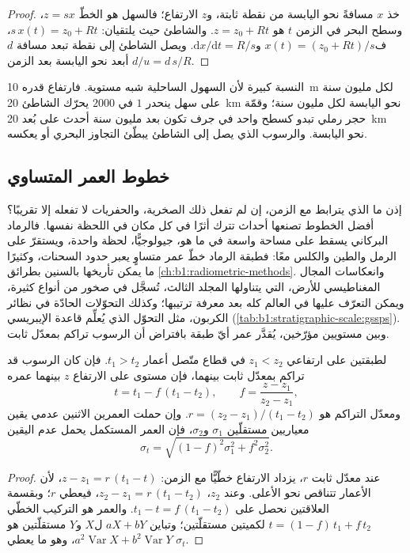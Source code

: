 \begin{proof}
خذ $x$ مسافةً نحو اليابسة من نقطة ثابتة، و$z$ الارتفاع؛ فالسهل هو الخطّ $z = s x$، وسطح البحر في الزمن $t$ هو $z = z_0 + R t$. والشاطئ حيث يلتقيان: $s\,x(t) = z_0 + R t$، ف$x(t) = (z_0 + R t)/s$ و$\mathrm dx/\mathrm dt = R/s$. ويصل الشاطئ إلى نقطة تبعد مسافة $d$ أبعد نحو اليابسة بعد الزمن $d/u = d\,s/R$.
\end{proof}

النسبة كبيرة لأن السهول الساحلية شبه مستوية. فارتفاع قدره \qty{10}{m} لكل مليون سنة على سهل ينحدر $1$ في $2000$ يحرّك الشاطئ \qty{20}{km} نحو اليابسة لكل مليون سنة؛ وقمّة حجر رملي تبدو كسطح واحد في جرف تكون بعد مليون سنة أحدث على بُعد \qty{20}{km} نحو اليابسة. والرسوب الذي يصل إلى الشاطئ يبطّئ التجاوز البحري أو يعكسه.

\subsection*{خطوط العمر المتساوي}

إذن ما الذي يترابط مع الزمن، إن لم تفعل ذلك الصخرية، والحفريات لا تفعله إلا تقريبًا؟ أفضل الخطوط تصنعها أحداث تترك أثرًا في كل مكان في اللحظة نفسها. فالرماد البركاني يسقط على مساحة واسعة في ما هو، جيولوجيًّا، لحظة واحدة، ويستقرّ على الرمل والطين والكلس معًا: فطبقة الرماد خطّ عمر متساوٍ يعبر حدود السحنات، وكثيرًا ما يمكن تأريخها بالسنين بطرائق \cref{ch:b1:radiometric-methods}. وانعكاسات المجال المغناطيسي للأرض، التي يتناولها المجلد الثالث، تُسجَّل في صخور من أنواع كثيرة، ويمكن التعرّف عليها في العالم كله بعد معرفة ترتيبها؛ وكذلك التحوّلات الحادّة في نظائر الكربون، مثل التحوّل الذي يُعلِّم قاعدة الإيبريسي (\cref{tab:b1:stratigraphic-scale:gssps}). وبين مستويين مؤرّخين، يُقدَّر عمر أيّ طبقة بافتراض أن الرسوب تراكم بمعدّل ثابت.

\begin{proposition}\label{prop:b1:stratigraphic-scale:interpolation}
لطبقتين على ارتفاعي $z_1 < z_2$ في قطاع متّصل أعمار $t_1 > t_2$. فإن كان الرسوب قد تراكم بمعدّل ثابت بينهما، فإن مستوى على الارتفاع $z$ بينهما عمره
\[
  t = t_1 - f\,(t_1 - t_2), \qquad f = \frac{z - z_1}{z_2 - z_1},
\]
ومعدّل التراكم هو $r = (z_2 - z_1)/(t_1 - t_2)$. وإن حملت العمرين الاثنين عدمي يقين معياريين مستقلّين $\sigma_1$ و$\sigma_2$، فإن العمر المستكمل يحمل عدم اليقين
\[
  \sigma_t = \sqrt{(1 - f)^2 \sigma_1^2 + f^2 \sigma_2^2}.
\]
\end{proposition}

\begin{proof}
عند معدّل ثابت $r$، يزداد الارتفاع خطّيًّا مع الزمن: $z - z_1 = r\,(t_1
- t)$، لأن الأعمار تتناقص نحو الأعلى. وعند $z_2$، $z_2 - z_1 = r\,(t_1 - t_2)$، فيعطي $r$؛ وبقسمة العلاقتين نحصل على $t_1 - t = f\,(t_1 - t_2)$. والعمر هو التركيب الخطّي $t = (1 - f)\,t_1 + f\,t_2$ لكميتين مستقلّتين؛ وتباين $a X + b Y$ ل$X$ و$Y$ مستقلّتين هو $a^2
\operatorname{Var} X + b^2 \operatorname{Var} Y$، وهو ما يعطي $\sigma_t$.
\end{proof}

